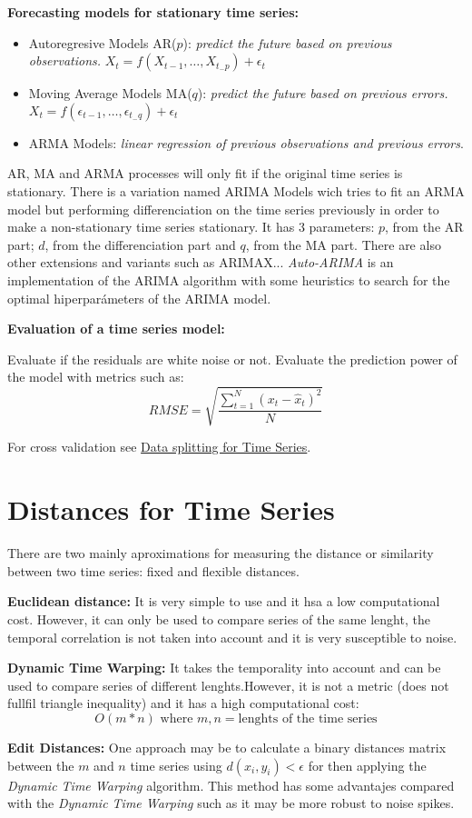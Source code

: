\textbf{Forecasting models for stationary time series:}
\begin{itemize}
    \item Autoregresive Models AR($p$): \textit{predict the future based on previous observations.} $X_t = f(X_{t-1}, \dots, X_{t_-p}) + \epsilon_t$
    \item Moving Average Models MA($q$): \textit{predict the future based on previous errors.} $X_t = f(\epsilon_{t-1}, \dots, \epsilon_{t_-q}) + \epsilon_t$
    \item ARMA Models: \textit{linear regression of previous observations and previous errors}.
\end{itemize}
AR, MA and ARMA processes will only fit if the original time series is stationary. There is a variation named ARIMA Models wich tries to fit an ARMA model but performing differenciation on the time series previously in order to make a non-stationary time series stationary. It has 3 parameters: $p$, from the AR part; $d$, from the differenciation part and $q$, from the MA part. There are also other extensions and variants such as ARIMAX... \textit{Auto-ARIMA} is an implementation of the ARIMA algorithm with some heuristics to search for the optimal hiperparámeters of the ARIMA model.

\textbf{Evaluation of a time series model:}

Evaluate if the residuals are white noise or not. Evaluate the prediction power of the model with metrics such as:
$$
RMSE = \sqrt{\frac{\sum_{t=1}^{N}(x_t - \hat{x}_t)^2}{N}}
$$

For cross validation see \href{https://topepo.github.io/caret/data-splitting.html}{Data splitting for Time Series}.


\section{Distances for Time Series}
There are two mainly aproximations for measuring the distance or similarity between two time series: fixed and flexible distances.

\textbf{Euclidean distance:} It is very simple to use and it hsa a low computational cost. However, it can only be used to compare series of the same lenght, the temporal correlation is not taken into account and it is very susceptible to noise.

\textbf{Dynamic Time Warping:} It takes the temporality into account and can be used to compare series of different lenghts.However, it is not a metric (does not fullfil triangle inequality) and it has a high computational cost: 
$$
    O(m*n) \text{ where } m,n =\text{lenghts of the time series}
$$ 

\textbf{Edit Distances:} One approach may be to calculate a binary distances matrix between the $m$ and $n$ time series using $d(x_i, y_i) < \epsilon$ for then applying the \textit{Dynamic Time Warping} algorithm. This method has some advantajes compared with the \textit{Dynamic Time Warping} such as it may be more robust to noise spikes.


